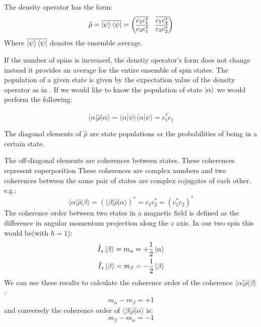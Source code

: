 The density operator has the form:
\begin{equation}
  \hat\rho = \overline{\ket{\psi}\bra{\psi}} = \begin{pmatrix}
    \overline{c_1c_1^*} & \overline{c_1c_2^*}\\
    \overline{c_2c_1^*} & \overline{c_2c_2^*}
\end{pmatrix}
\end{equation}
Where $\overline{\ket{\psi}\bra{\psi}}$ denotes the ensemble average.

If the number of spins is increased, the denstiy operator's form does not change instead it provides
an average for the entire ensemble of spin states. The population of a given state is given by the expectation
value of the density operator as in . If we would like to know
the population of state $\ket{\alpha}$ we would perform the following:

\begin{equation}
  \langle\alpha\vert\hat\rho\vert\alpha\rangle = \overline{\langle\alpha\vert\psi\rangle} \overline{\langle\alpha\vert\psi\rangle} = \overline{c_1^*c_1}
\end{equation}

The diagonal elements of $\hat\rho$ are state populations or the probabilities of being in a certain state.

The off-diagonal elements are coherences between states. These coherences represent superposition These coherences are complex numbers and two coherences between the same pair of states are complex cojugates of each other. e.g.:
\begin{equation}
  \langle\alpha\vert\hat\rho\vert\beta\rangle = (\langle\beta\vert\hat\rho\vert\alpha\rangle)^* = c_1c_2^* = (c_1^*c_2)^*
\end{equation}
The coherence order between two states in a magnetic field is defined as the difference in angular
momentum projection along the $z$ axis. In our two spin this would be(with $\hbar = 1$):
\begin{align}
  \hat{I}_z\ket{\beta} = m_\alpha = +\frac{1}{2}\ket{\alpha}\\
  \hat{I}_z\ket{\beta} = m_\beta = -\frac{1}{2}\ket{\beta}
\end{align}
We can use these results to calculate the coherence order of the coherence $\langle\alpha\vert\hat\rho\vert\beta\rangle$:
\begin{equation}
 m_\alpha - m_\beta = +1
\end{equation}
and conversely the coherence order of $\langle\beta\vert\hat\rho\vert\alpha\rangle$ is:
\begin{equation}
  m_\beta - m_\alpha = -1
\end{equation}

